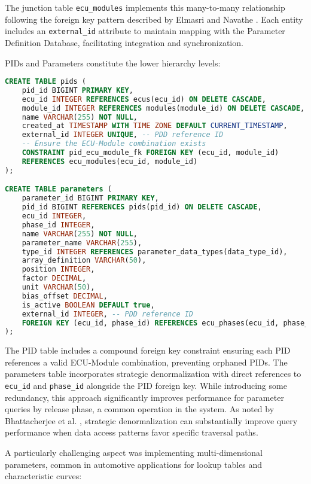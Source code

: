 The junction table \texttt{ecu\_modules} implements this many-to-many relationship following the foreign key pattern described by Elmasri and Navathe \cite{elmasri2015fundamentals}. Each entity includes an \texttt{external\_id} attribute to maintain mapping with the Parameter Definition Database, facilitating integration and synchronization.

PIDs and Parameters constitute the lower hierarchy levels:

\begin{lstlisting}[language=SQL, caption={PID and Parameter Table Implementation}, label={lst:pid-parameter-tables}]
CREATE TABLE pids (
    pid_id BIGINT PRIMARY KEY,
    ecu_id INTEGER REFERENCES ecus(ecu_id) ON DELETE CASCADE,
    module_id INTEGER REFERENCES modules(module_id) ON DELETE CASCADE,
    name VARCHAR(255) NOT NULL,
    created_at TIMESTAMP WITH TIME ZONE DEFAULT CURRENT_TIMESTAMP,
    external_id INTEGER UNIQUE, -- PDD reference ID
    -- Ensure the ECU-Module combination exists
    CONSTRAINT pid_ecu_module_fk FOREIGN KEY (ecu_id, module_id) 
    REFERENCES ecu_modules(ecu_id, module_id)
);

CREATE TABLE parameters (
    parameter_id BIGINT PRIMARY KEY,
    pid_id BIGINT REFERENCES pids(pid_id) ON DELETE CASCADE,
    ecu_id INTEGER,
    phase_id INTEGER,
    name VARCHAR(255) NOT NULL,
    parameter_name VARCHAR(255),
    type_id INTEGER REFERENCES parameter_data_types(data_type_id),
    array_definition VARCHAR(50),
    position INTEGER,
    factor DECIMAL,
    unit VARCHAR(50),
    bias_offset DECIMAL,
    is_active BOOLEAN DEFAULT true,
    external_id INTEGER, -- PDD reference ID
    FOREIGN KEY (ecu_id, phase_id) REFERENCES ecu_phases(ecu_id, phase_id)
);
\end{lstlisting}

The PID table includes a compound foreign key constraint ensuring each PID references a valid ECU-Module combination, preventing orphaned PIDs. The parameters table incorporates strategic denormalization with direct references to \texttt{ecu\_id} and \texttt{phase\_id} alongside the PID foreign key. While introducing some redundancy, this approach significantly improves performance for parameter queries by release phase, a common operation in the system. As noted by Bhattacherjee et al. \cite{bhattacherjee2015principles}, strategic denormalization can substantially improve query performance when data access patterns favor specific traversal paths.

A particularly challenging aspect was implementing multi-dimensional parameters, common in automotive applications for lookup tables and characteristic curves:

